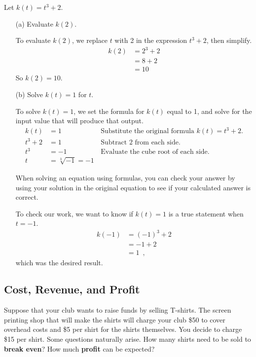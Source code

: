 \begin{example}
Let $k(t) = t^3 + 2$.
    \begin{itemize}
        \item[(a)] Evaluate $k(2)$.

        \solution To evaluate $k(2)$, we replace $t$ with 2 in the expression $t^3+2$, then simplify.
        \begin{align*}
            k(2) &= 2^3 + 2 \\
            &= 8 + 2 \\
            &= 10
        \end{align*}
        So $k(2) = 10$.
        \item[(b)] Solve $k(t) = 1$ for $t$.

        \solution To solve $k(t) = 1$, we set the formula for $k(t)$ equal to 1, and solve for the input value that will produce that output.
        \begin{align*}
            k(t)    &=  1 &\, \mbox{Substitute the original formula } k(t) = t^3 + 2.\\
            t^3 + 2 &=  1 &\, \mbox{Subtract 2 from each side}. \\
            t^3     &= -1 &\, \mbox{Evaluate the cube root of each side.}\\
            t       &= \sqrt[3]{-1} = -1
        \end{align*}

When solving an equation using formulas, you can check your answer by using your solution in the original equation to see if your calculated answer is correct.

To check our work, we want to know if $k(t)=1$ is a true statement when $t=-1$.
    \begin{align*}
        k(-1) &= (-1)^3 + 2 \\
              &= -1 + 2 \\
              &= 1 \enspace ,
          \end{align*}
which was the desired result.
    \end{itemize}
\end{example}


\subsection{Cost, Revenue, and Profit}

Suppose that your club wants to raise funds by selling T-shirts. The screen printing shop that will make the shirts will charge your club \$50 to cover overhead costs and \$5 per shirt for the shirts themselves. You decide to charge \$15 per shirt. Some questions naturally arise. How many shirts need to be sold to {\bf break even}? How much {\bf profit} can be expected?

